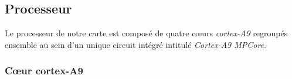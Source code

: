 
    \subsection{Processeur}

        Le processeur de notre carte est composé de quatre cœurs \emph{cortex-A9} regroupés ensemble au sein d'un unique circuit intégré intitulé \emph{Cortex-A9 MPCore}.

        \subsubsection{Cœur cortex-A9}


